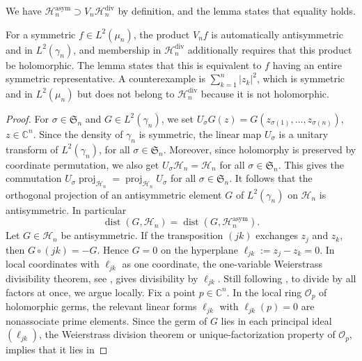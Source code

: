 \documentclass[11pt,reqno]{amsart}
\numberwithin{equation}{section}%
\numberwithin{figure}{section}%
\numberwithin{table}{section}
\theoremstyle{plain}
\theoremstyle{definition}
\begin{document}
We have $\mathcal{H}_n^{\mathrm{asym}}\supset V_n\mathcal{H}_n^{\mathrm{div}}$
by definition, and the lemma states that equality holds.

For a symmetric $f\in L^2(\mu_n)$, the product $V_nf$ is automatically
antisymmetric and in $L^2(\gamma_n)$, and membership in
$\mathcal{H}_n^{\mathrm{div}}$ additionally requires that this product be
holomorphic. The lemma states that this is equivalent to $f$ having an entire
symmetric representative. A counterexample is $\sum_{k=1}^n|z_k|^2$, which is
symmetric and in $L^2(\mu_n)$ but does not belong to
$\mathcal{H}_n^{\mathrm{div}}$ because it is not holomorphic.

\begin{proof}
  For $\sigma\in\mathfrak{S}_n$ and $G\in L^2(\gamma_n)$, we set
  $U_\sigma G(z)=G(z_{\sigma(1)},\ldots,z_{\sigma(n)})$, $z\in\mathbb{C}^n$.
  Since the density of $\gamma_n$ is symmetric, the linear map $U_\sigma$ is a
  unitary transform of $L^2(\gamma_n)$, for all $\sigma\in\mathfrak{S}_n$.
  Moreover, since holomorphy is preserved by coordinate permutation, we also
  get $U_\sigma\mathcal{H}_n=\mathcal{H}_n$ for all $\sigma\in\mathfrak{S}_n$.
  This gives the commutation
  $U_\sigma\operatorname{proj}_{\mathcal{H}_n}=\operatorname{proj}_{\mathcal{H}_n}U_\sigma$
  for all $\sigma\in\mathfrak{S}_n$. It follows that the orthogonal projection
  of an antisymmetric element $G$ of $L^2(\gamma_n)$ on $\mathcal{H}_n$ is
  antisymmetric. In particular
  \begin{equation}
    \operatorname{dist}(G,\mathcal{H}_n)=\operatorname{dist}(G,\mathcal{H}_n^{\mathrm{asym}}).
  \end{equation}
  Let $G\in\mathcal{H}_n$ be antisymmetric. If the transposition $(jk)$
  exchanges $z_j$ and $z_k$, then $G\circ(jk)=-G$. Hence $G=0$ on the
  hyperplane $\ell_{jk}:=z_j-z_k=0$. In local coordinates with $\ell_{jk}$ as
  one coordinate, the one-variable Weierstrass divisibility theorem, see
  \cite[Sec.~6.1 and 6.2]{HormanderComplexAnalysisSeveralVariables}, gives
  divisibility by $\ell_{jk}$. Still following \cite[Sec.~6.1 and
  6.2]{HormanderComplexAnalysisSeveralVariables}, to divide by all factors at
  once, we argue locally. Fix a point $p\in\mathbb{C}^n$. In the local ring
  $\mathcal O_p$ of holomorphic germs, the relevant linear forms $\ell_{jk}$
  with $\ell_{jk}(p)=0$ are nonassociate prime elements. Since the germ of $G$
  lies in each principal ideal $(\ell_{jk})$, the Weierstrass division theorem
  or unique-factorization property of $\mathcal O_p$, implies that it lies in

\end{proof}
\end{document}
